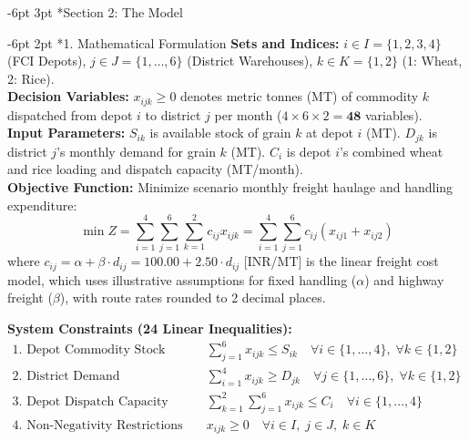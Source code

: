 \documentclass[10pt,a4paper]{article}
\makeatletter
\renewcommand\section{\@startsection {section}{1}{\z@}%
                                   {-6pt \@plus -2pt \@minus -2pt}%
                                   {3pt \@plus 1pt}%
                                   {\normalfont\Large\bfseries}}
\renewcommand\subsection{\@startsection{subsection}{2}{\z@}%
                                     {-6pt \@plus -2pt \@minus -1pt}%
                                     {2pt \@plus 1pt}%
                                     {\normalfont\large\bfseries}}
\makeatother
\begin{document}
\newpage

\section*{Section 2: The Model}

\subsection*{1. Mathematical Formulation}
\textbf{Sets and Indices:} $i \in I = \{1, 2, 3, 4\}$ (FCI Depots), $j \in J = \{1, \dots, 6\}$ (District Warehouses), $k \in K = \{1, 2\}$ (1: Wheat, 2: Rice).\\[2pt]
\textbf{Decision Variables:} $x_{ijk} \ge 0$ denotes metric tonnes (MT) of commodity $k$ dispatched from depot $i$ to district $j$ per month ($4 \times 6 \times 2 = \mathbf{48}$ variables).\\[2pt]
\textbf{Input Parameters:} $S_{ik}$ is available stock of grain $k$ at depot $i$ (MT). $D_{jk}$ is district $j$'s monthly demand for grain $k$ (MT). $C_i$ is depot $i$'s combined wheat and rice loading and dispatch capacity (MT/month).\\[2pt]
\textbf{Objective Function:} Minimize scenario monthly freight haulage and handling expenditure:
\begin{equation}
\min Z = \sum_{i=1}^4 \sum_{j=1}^6 \sum_{k=1}^2 c_{ij} x_{ijk} = \sum_{i=1}^4 \sum_{j=1}^6 c_{ij} (x_{ij1} + x_{ij2})
\end{equation}
where $c_{ij} = \alpha + \beta \cdot d_{ij} = 100.00 + 2.50 \cdot d_{ij}$ [INR/MT] is the linear freight cost model, which uses illustrative assumptions for fixed handling ($\alpha$) and highway freight ($\beta$), with route rates rounded to 2 decimal places.

\textbf{System Constraints (24 Linear Inequalities):}
\begin{align}
\text{1. Depot Commodity Stock Limits (8):} \quad & \sum_{j=1}^6 x_{ijk} \le S_{ik} \quad \forall i \in \{1, \dots, 4\}, \; \forall k \in \{1, 2\} \\
\text{2. District Demand Requirements (12):} \quad & \sum_{i=1}^4 x_{ijk} \ge D_{jk} \quad \forall j \in \{1, \dots, 6\}, \; \forall k \in \{1, 2\} \\
\text{3. Depot Dispatch Capacity Coupling (4):} \quad & \sum_{k=1}^2 \sum_{j=1}^6 x_{ijk} \le C_i \quad \forall i \in \{1, \dots, 4\} \\
\text{4. Non-Negativity Restrictions (48):} \quad & x_{ijk} \ge 0 \quad \forall i \in I, \; j \in J, \; k \in K
\end{align}
\end{document}
